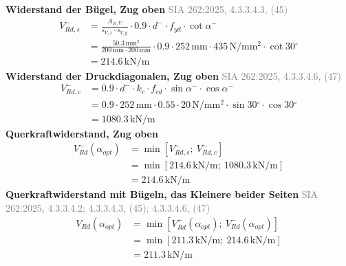 \documentclass[11pt,a4paper]{article}
\newcommand{\normref}[1]{{\small\textcolor{gray}{#1}}}
\begin{document}
\noindent\textbf{Widerstand der Bügel, Zug oben} \hfill \normref{SIA 262:2025, 4.3.3.4.3, (45)}
\begin{equation*}
\begin{aligned}
  V_{Rd,s}^{-} &= \frac{A_{\varnothing,V}}{s_{V,x} \cdot s_{V,y}} \cdot 0.9 \cdot d^{-} \cdot f_{yd} \cdot \cot \alpha^{-} \\
  &= \frac{50.3\,\mathrm{mm}^{2}}{200\,\mathrm{mm} \cdot 200\,\mathrm{mm}} \cdot 0.9 \cdot 252\,\mathrm{mm} \cdot 435\,\mathrm{N}/\mathrm{mm}^{2} \cdot \cot 30{}^{\circ} \\
  &= 214.6\,\mathrm{kN}/\mathrm{m}
\end{aligned}
\end{equation*}
\noindent\textbf{Widerstand der Druckdiagonalen, Zug oben} \hfill \normref{SIA 262:2025, 4.3.3.4.6, (47)}
\begin{equation*}
\begin{aligned}
  V_{Rd,c}^{-} &= 0.9 \cdot d^{-} \cdot k_c \cdot f_{cd} \cdot \sin \alpha^{-} \cdot \cos \alpha^{-} \\
  &= 0.9 \cdot 252\,\mathrm{mm} \cdot 0.55 \cdot 20\,\mathrm{N}/\mathrm{mm}^{2} \cdot \sin 30{}^{\circ} \cdot \cos 30{}^{\circ} \\
  &= 1080.3\,\mathrm{kN}/\mathrm{m}
\end{aligned}
\end{equation*}
\noindent\textbf{Querkraftwiderstand, Zug oben}
\begin{equation*}
\begin{aligned}
  V_{Rd}^{-}(\alpha_{opt}) &= \min\left[V_{Rd,s}^{-};\ V_{Rd,c}^{-}\right] \\
  &= \min\left[214.6\,\mathrm{kN}/\mathrm{m};\ 1080.3\,\mathrm{kN}/\mathrm{m}\right] \\
  &= 214.6\,\mathrm{kN}/\mathrm{m}
\end{aligned}
\end{equation*}
\noindent\textbf{Querkraftwiderstand mit Bügeln, das Kleinere beider Seiten} \hfill \normref{SIA 262:2025, 4.3.3.4.2; 4.3.3.4.3, (45); 4.3.3.4.6, (47)}
\begin{equation*}
\begin{aligned}
  V_{Rd}(\alpha_{opt}) &= \min\left[V_{Rd}^{+}(\alpha_{opt});\ V_{Rd}^{-}(\alpha_{opt})\right] \\
  &= \min\left[211.3\,\mathrm{kN}/\mathrm{m};\ 214.6\,\mathrm{kN}/\mathrm{m}\right] \\
  &= 211.3\,\mathrm{kN}/\mathrm{m}
\end{aligned}
\end{equation*}
\end{document}
